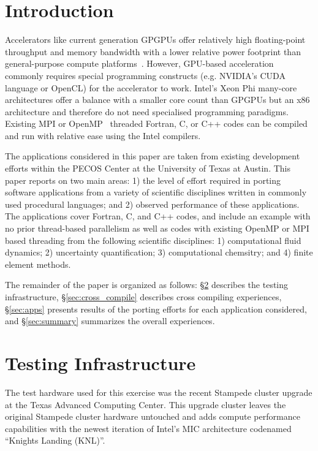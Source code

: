 \section{Introduction}
\label{sec:intro}

Accelerators like current generation GPGPUs offer relatively high
floating-point throughput and memory bandwidth with a lower relative power
footprint than general-purpose compute platforms~\cite{gpu_hpc:2009}. However,
GPU-based acceleration commonly requires special programming constructs (e.g.
NVIDIA's CUDA language\cite{} or OpenCL\cite{}) for the accelerator to work.
Intel's Xeon Phi many-core architectures offer a balance with a smaller core count than GPGPUs
but an x86 architecture and therefore do not need specialised programming
paradigms.  Existing MPI or OpenMP~\cite{openmp_standard} threaded Fortran, C,
or C++ codes can be compiled and run with relative ease using the Intel compilers.

The applications considered in this paper are taken from existing development
efforts within the PECOS Center\cite{} at the University of Texas at Austin.  This
paper reports on two main areas: 1) the level of effort required in porting
software applications from a variety of scientific disciplines written in
commonly used procedural languages; and 2) observed performance of these
applications.  The applications cover Fortran, C, and C++ codes, and include
an example with no prior thread-based parallelism as well as codes with
existing OpenMP or MPI based threading from the following scientific
disciplines: 1) computational fluid dynamics; 2) uncertainty quantification;
3) computational chemsitry; and 4) finite element methods.

The remainder of the paper is organized as follows: \S\ref{sec:hardware}
describes the testing infrastructure, \S\ref{sec:cross_compile} describes cross
compiling experiences, \S\ref{sec:apps} presents results of the porting efforts
for each application considered, and \S\ref{sec:summary} summarizes the overall
experiences.

\section{Testing Infrastructure}
\label{sec:hardware}

The test hardware used for this exercise was the recent Stampede cluster
upgrade at the Texas Advanced Computing Center.  This upgrade cluster leaves
the original Stampede cluster hardware untouched and adds compute performance
capabilities with the newest iteration of Intel's MIC architecture codenamed
``Knights Landing (KNL)''.


